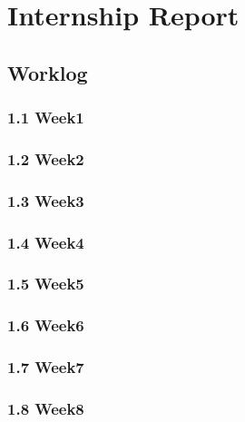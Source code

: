 \providecommand{\tightlist}{%
  \setlength{\itemsep}{0pt}\setlength{\parskip}{0pt}%
}

\section{Internship Report}

\subsection{Worklog}

\subsubsection{1.1 Week1}


\subsubsection{1.2 Week2}


\subsubsection{1.3 Week3}


\subsubsection{1.4 Week4}


\subsubsection{1.5 Week5}


\subsubsection{1.6 Week6}


\subsubsection{1.7 Week7}


\subsubsection{1.8 Week8}


